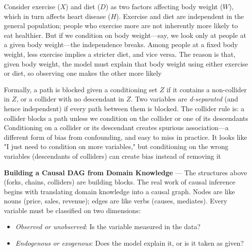 Consider exercise ($X$) and diet ($D$) as two factors affecting body weight ($W$),
which in turn affects heart disease ($H$). Exercise and diet are independent in
the general population; people who exercise more are not inherently more likely to
eat healthier. But if we condition on body weight—say, we look only at people at
a given body weight—the independence breaks. Among people at a fixed body weight,
less exercise implies a stricter diet, and vice versa. The reason is that, given
body weight, the model must explain that body weight using either exercise or diet,
so observing one makes the other more likely

Formally, a path is blocked given a conditioning set $Z$ if it contains a non-collider
in $Z$, or a collider with no descendant in $Z$. Two variables are \emph{d-separated}
(and hence independent) if every path between them is blocked. The collider rule
is: a collider blocks a path unless we condition on the collider or one of its descendants
Conditioning on a collider or its descendant creates spurious association—a
different form of bias from confounding, and easy to miss in practice. It looks
like "I just need to condition on more variables," but conditioning on the wrong
variables (descendants of colliders) can create bias instead of removing it


\textbf{Building a Causal DAG from Domain Knowledge} --- The structures above (forks,
chains, colliders) are building blocks. The real work of causal inference begins
with translating domain knowledge into a causal graph. Nodes are like nouns (price,
sales, revenue); edges are like verbs (causes, mediates). Every variable must be
classified on two dimensions:

\begin{itemize}
  \item \emph{Observed or unobserved}: Is the variable measured in the data?

  \item \emph{Endogenous or exogenous}: Does the model explain it, or is it
    taken as given?
\end{itemize}

